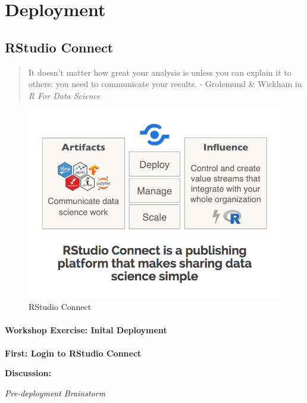 \documentclass[]{book}
\theoremstyle{definition}
\theoremstyle{definition}
\theoremstyle{definition}
\theoremstyle{remark}
\begin{document}
\hypertarget{deployment}{%
\chapter{Deployment}\label{deployment}}

\hypertarget{rstudio-connect}{%
\section{RStudio Connect}\label{rstudio-connect}}

\begin{quote}
It doesn't matter how great your analysis is unless you can explain it
to others: you need to communicate your results. - Grolemund \& Wickham
in \emph{R For Data Science}
\end{quote}

\begin{figure}
\centering
\includegraphics{imgs/deployment/rstudio-connect.png}
\caption{RStudio Connect}
\end{figure}

\hypertarget{workshop-exercise-inital-deployment}{%
\subsubsection{Workshop Exercise: Inital
Deployment}\label{workshop-exercise-inital-deployment}}

\textbf{First: Login to RStudio Connect}

\textbf{Discussion:}

\emph{Pre-deployment Brainstorm}
\end{document}
